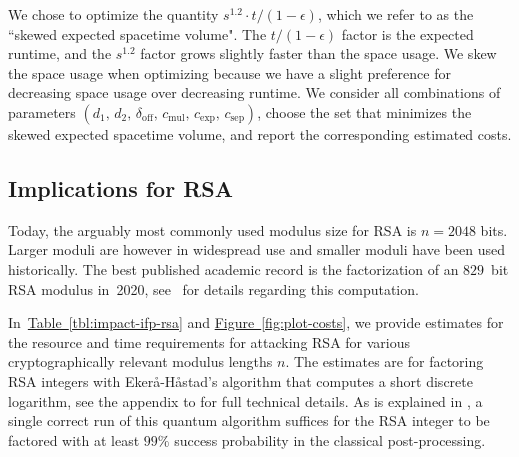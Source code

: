 \documentclass[superscriptaddress,notitlepage,longbibliography]{revtex4-1}
\theoremstyle{definition}
\theoremstyle{definition}
\newcommand{\fig}[1]{\hyperref[fig:#1]{Figure~\ref*{fig:#1}}}
\newcommand{\tbl}[1]{\hyperref[tbl:#1]{Table~\ref*{tbl:#1}}}
\newcommand{\devoff}{{\delta_{\text{off}}}}
\newcommand{\gexp}{{c_{\text{exp}}}}
\newcommand{\gmul}{{c_{\text{mul}}}}
\newcommand{\gsep}{{c_{\text{sep}}}}
\newcommand{\distone}{{d_1}}
\newcommand{\disttwo}{{d_2}}
\begin{document}
We chose to optimize the quantity $s^{1.2} \cdot t / (1 - \epsilon)$, which we refer to as the ``skewed expected spacetime volume".
The $t / (1 - \epsilon)$ factor is the expected runtime, and the $s^{1.2}$ factor grows slightly faster than the space usage.
We skew the space usage when optimizing because we have a slight preference for decreasing space usage over decreasing runtime.
We consider all combinations of parameters $(\distone, \, \disttwo, \, \devoff, \, \gmul, \, \gexp, \, \gsep)$, choose the set that minimizes the skewed expected spacetime volume, and report the corresponding estimated costs.

\subsection{Implications for RSA}
Today, the arguably most commonly used modulus size for RSA is $n=2048$ bits.
Larger moduli are however in widespread use and smaller moduli have been used historically.
The best published academic record is the factorization of an $829$~bit RSA modulus in~2020, see~\cite{boudot-rsa829} for details regarding this computation.

In~\tbl{impact-ifp-rsa} and \fig{plot-costs}, we provide estimates for the resource and time requirements for attacking RSA for various cryptographically relevant modulus lengths $n$. The estimates are for factoring RSA integers with Ekerå-Håstad's algorithm \cite{ekeraa2017quantum,  ekeraa2017pp} that computes a short discrete logarithm, see the appendix to \cite{ekeraa2017pp} for full technical details. As is explained in \cite{ekeraa2017pp}, a single correct run of this quantum algorithm suffices for the RSA integer to be factored with at least $99\%$ success probability in the classical post-processing.
\end{document}
